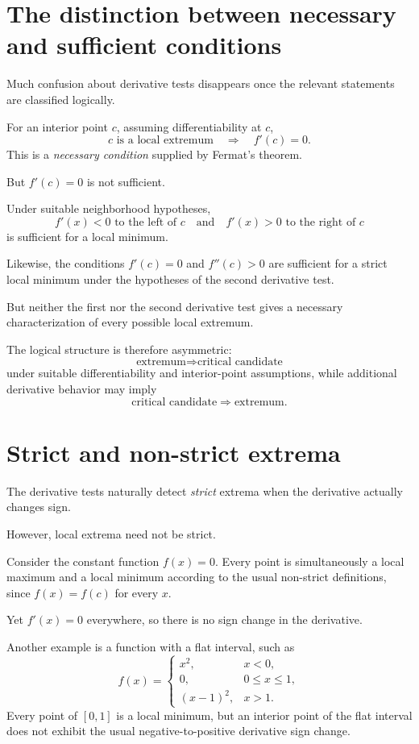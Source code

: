 \documentclass{essay}
\begin{document}
\section{The distinction between necessary and sufficient conditions}

Much confusion about derivative tests disappears once the relevant statements are classified logically.

For an interior point \(c\), assuming differentiability at \(c\),
\[
\text{\(c\) is a local extremum}
\quad\Longrightarrow\quad
f'(c)=0.
\]
This is a \emph{necessary condition} supplied by Fermat's theorem.

But \(f'(c)=0\) is not sufficient.

Under suitable neighborhood hypotheses,
\[
f'(x)<0\text{ to the left of }c
\quad\text{and}\quad
f'(x)>0\text{ to the right of }c
\]
is sufficient for a local minimum.

Likewise, the conditions \(f'(c)=0\) and \(f''(c)>0\) are sufficient for a strict local minimum under the hypotheses of the second derivative test.

But neither the first nor the second derivative test gives a necessary characterization of every possible local extremum.

The logical structure is therefore asymmetric:
\[
\text{extremum}
\Longrightarrow
\text{critical candidate}
\]
under suitable differentiability and interior-point assumptions, while additional derivative behavior may imply
\[
\text{critical candidate}
\Longrightarrow
\text{extremum}.
\]

\section{Strict and non-strict extrema}

The derivative tests naturally detect \emph{strict} extrema when the derivative actually changes sign.

However, local extrema need not be strict.

Consider the constant function \(f(x)=0\).
Every point is simultaneously a local maximum and a local minimum according to the usual non-strict definitions, since
\(f(x)=f(c)\) for every \(x\).

Yet \(f'(x)=0\) everywhere, so there is no sign change in the derivative.

Another example is a function with a flat interval, such as
\[
f(x)=
\begin{cases}
x^2, & x<0,\\
0, & 0\leq x\leq1,\\
(x-1)^2, & x>1.
\end{cases}
\]
Every point of \([0,1]\) is a local minimum, but an interior point of the flat interval does not exhibit the usual negative-to-positive derivative sign change.
\end{document}
